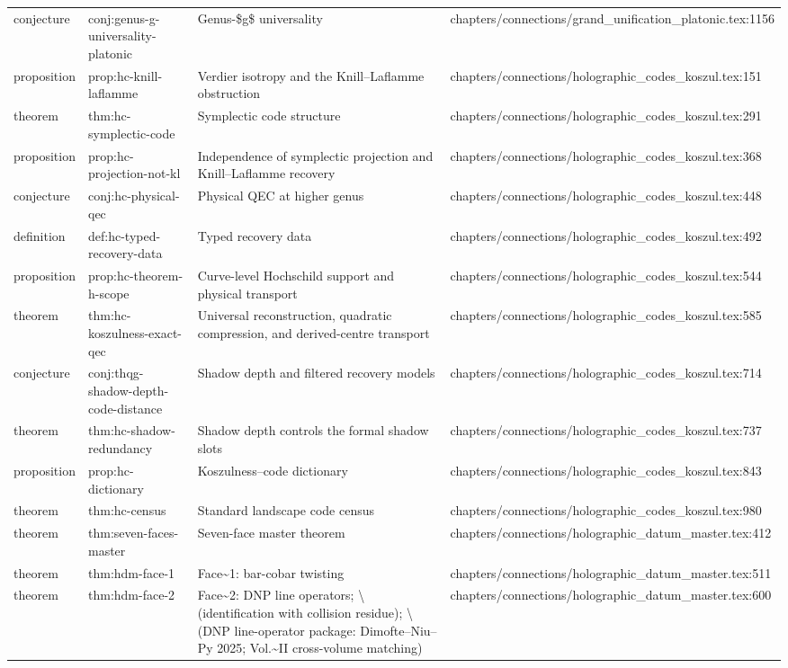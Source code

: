 \documentclass[11pt]{article}
\begin{document}
\begin{longtable}{L{0.10\textwidth}L{0.26\textwidth}L{0.42\textwidth}L{0.22\textwidth}}
conjecture & conj:genus-g-universality-platonic & Genus-\$g\$ universality & chapters/connections/grand\_unification\_platonic.tex:1156\\
proposition & prop:hc-knill-laflamme & Verdier isotropy and the Knill--Laflamme obstruction & chapters/connections/holographic\_codes\_koszul.tex:151\\
theorem & thm:hc-symplectic-code & Symplectic code structure & chapters/connections/holographic\_codes\_koszul.tex:291\\
proposition & prop:hc-projection-not-kl & Independence of symplectic projection and Knill--Laflamme recovery & chapters/connections/holographic\_codes\_koszul.tex:368\\
conjecture & conj:hc-physical-qec & Physical QEC at higher genus & chapters/connections/holographic\_codes\_koszul.tex:448\\
definition & def:hc-typed-recovery-data & Typed recovery data & chapters/connections/holographic\_codes\_koszul.tex:492\\
proposition & prop:hc-theorem-h-scope & Curve-level Hochschild support and physical transport & chapters/connections/holographic\_codes\_koszul.tex:544\\
theorem & thm:hc-koszulness-exact-qec & Universal reconstruction, quadratic compression, and derived-centre transport & chapters/connections/holographic\_codes\_koszul.tex:585\\
conjecture & conj:thqg-shadow-depth-code-distance & Shadow depth and filtered recovery models & chapters/connections/holographic\_codes\_koszul.tex:714\\
theorem & thm:hc-shadow-redundancy & Shadow depth controls the formal shadow slots & chapters/connections/holographic\_codes\_koszul.tex:737\\
proposition & prop:hc-dictionary & Koszulness--code dictionary & chapters/connections/holographic\_codes\_koszul.tex:843\\
theorem & thm:hc-census & Standard landscape code census & chapters/connections/holographic\_codes\_koszul.tex:980\\
theorem & thm:seven-faces-master & Seven-face master theorem & chapters/connections/holographic\_datum\_master.tex:412\\
theorem & thm:hdm-face-1 & Face\textasciitilde{}1: bar-cobar twisting & chapters/connections/holographic\_datum\_master.tex:511\\
theorem & thm:hdm-face-2 & Face\textasciitilde{}2: DNP line operators; \textbackslash{} (identification with collision residue); \textbackslash{} (DNP line-operator package: Dimofte--Niu--Py 2025; Vol.\textasciitilde{}II cross-volume matching) & chapters/connections/holographic\_datum\_master.tex:600\\

\end{longtable}
\end{document}
